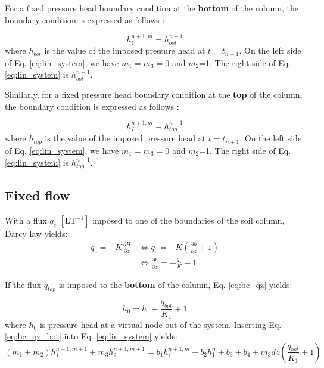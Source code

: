 \documentclass[a4paper,12pt]{article}
\begin{document}
For a fixed pressure head boundary condition at the \textbf{bottom} of the column, the boundary condition is expressed as follows :

\begin{equation}
    h_1^{n+1,m} = h_{bot}^{n+1}
    \label{eq:bc_fixed_bot}
\end{equation}
where $h_{bot}$ is the value of the imposed pressure head at $t = t_{n+1}$. On the left side of Eq. \ref{eq:lin_system}, we have $m_1 = m_3 = 0$ and $m_2$=1. The right side of Eq. \ref{eq:lin_system} is $h_{bot}^{n+1}$.

Similarly, for a fixed pressure head boundary condition at the \textbf{top} of the column, the boundary condition is expressed as follows :

\begin{equation}
    h_I^{n+1,m} = h_{top}^{n+1}
    \label{eq:bc_fixed_top}
\end{equation}
where $h_{top}$ is the value of the imposed pressure head at $t = t_{n+1}$. On the left side of Eq. \ref{eq:lin_system}, we have $m_1 = m_3 = 0$ and $m_2$=1. The right side of Eq. \ref{eq:lin_system} is $h_{top}^{n+1}$.


\subsection{Fixed flow}

With a flux $q_z$ $\mathrm{[LT^{-1}]}$ imposed to one of the boundaries of the soil column, Darcy law yields: 
\begin{align}
    q_z = -K \frac{\partial H}{\partial z} &\iff q_z= -K \left( \frac{\partial h}{\partial z} + 1 \right) \nonumber \\
					   &\iff \frac{\partial h}{\partial z} = - \frac{q_z}{K} - 1 
    \label{eq:bc_qz}
\end{align}

If the flux $q_{top}$ is imposed to the \textbf{bottom} of the column, Eq. \ref{eq:bc_qz} yields:

\begin{equation}
     h_0 = h_1  + \frac{q_{bot}}{K_1} + 1
    \label{eq:bc_qz_bot}
\end{equation}
where $h_{0}$ is pressure head at a virtual node out of the system. Inserting Eq. \ref{eq:bc_qz_bot} into Eq. \ref{eq:lin_system} yields: 
\begin{equation}
    (m_1 + m_2) h_1^{n+1,m+1} + m_3 h_{2}^{n+1,m+1} = b_1 h_1^{n+1,m} + b_2 h_1^n + b_3 + b_4 + m_3 dz \left( \frac{q_{bot}}{K_1} +1 \right)
    \label{eq:bc_qz_lin_system_bot}
\end{equation}
\end{document}
